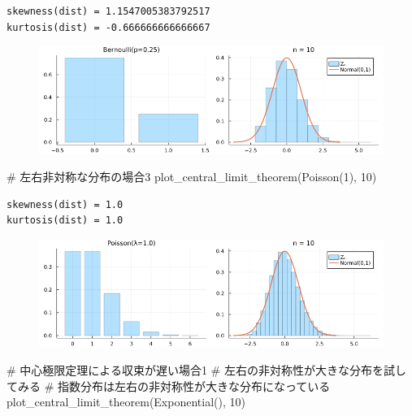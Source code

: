 \documentclass[
  letterpaper,
  DIV=11,
  numbers=noendperiod]{scrartcl}
\newenvironment{Shaded}{\begin{snugshade}}{\end{snugshade}}
\newcommand{\CommentTok}[1]{\textcolor[rgb]{0.37,0.37,0.37}{#1}}
\newcommand{\FloatTok}[1]{\textcolor[rgb]{0.68,0.00,0.00}{#1}}
\newcommand{\FunctionTok}[1]{\textcolor[rgb]{0.28,0.35,0.67}{#1}}
\newcommand{\NormalTok}[1]{\textcolor[rgb]{0.00,0.23,0.31}{#1}}
\begin{document}
\begin{verbatim}
skewness(dist) = 1.1547005383792517
kurtosis(dist) = -0.666666666666667
\end{verbatim}

\begin{figure}[H]

{\centering \includegraphics{05 Central limit theorem_files/figure-pdf/cell-79-output-2.png}

}

\end{figure}

\begin{Shaded}
\begin{Highlighting}[]
\CommentTok{\# 左右非対称な分布の場合3}
\FunctionTok{plot\_central\_limit\_theorem}\NormalTok{(}\FunctionTok{Poisson}\NormalTok{(}\FloatTok{1}\NormalTok{), }\FloatTok{10}\NormalTok{)}
\end{Highlighting}
\end{Shaded}

\begin{verbatim}
skewness(dist) = 1.0
kurtosis(dist) = 1.0
\end{verbatim}

\begin{figure}[H]

{\centering \includegraphics{05 Central limit theorem_files/figure-pdf/cell-80-output-2.png}

}

\end{figure}

\begin{Shaded}
\begin{Highlighting}[]
\CommentTok{\# 中心極限定理による収束が遅い場合1}
\CommentTok{\# 左右の非対称性が大きな分布を試してみる}
\CommentTok{\# 指数分布は左右の非対称性が大きな分布になっている}
\FunctionTok{plot\_central\_limit\_theorem}\NormalTok{(}\FunctionTok{Exponential}\NormalTok{(), }\FloatTok{10}\NormalTok{)}
\end{Highlighting}
\end{Shaded}
\end{document}
